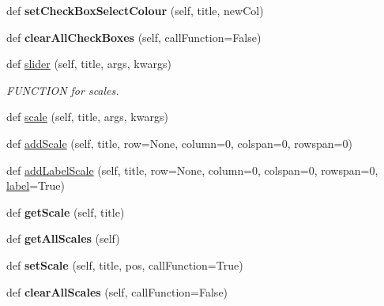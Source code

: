 \begin{DoxyCompactItemize}
def {\bfseries set\+Check\+Box\+Select\+Colour} (self, title, new\+Col)
\item 
\mbox{\label{class_python_01_g_u_i_1_1appjar_1_1gui_aaacc8db583838a4797aa585756f351b2}} 
def {\bfseries clear\+All\+Check\+Boxes} (self, call\+Function=False)
\item 
def \hyperlink{class_python_01_g_u_i_1_1appjar_1_1gui_af601e0be18cecae7abee6e159e45338a}{slider} (self, title, args, kwargs)
\begin{DoxyCompactList}\small\item\em F\+U\+N\+C\+T\+I\+ON for scales. \end{DoxyCompactList}\item 
def \hyperlink{class_python_01_g_u_i_1_1appjar_1_1gui_af487197cf6060c841c8fcfebeb77e314}{scale} (self, title, args, kwargs)
\item 
def \hyperlink{class_python_01_g_u_i_1_1appjar_1_1gui_a67f755e4d8eaa248bb8741f82b56c7e7}{add\+Scale} (self, title, row=None, column=0, colspan=0, rowspan=0)
\item 
def \hyperlink{class_python_01_g_u_i_1_1appjar_1_1gui_a7c00d0c50fa34004e61500001abc4e76}{add\+Label\+Scale} (self, title, row=None, column=0, colspan=0, rowspan=0, \hyperlink{class_python_01_g_u_i_1_1appjar_1_1gui_a899e593dca96dd2a31035558b685e3bd}{label}=True)
\item 
\mbox{\label{class_python_01_g_u_i_1_1appjar_1_1gui_a61db75894a43e88c3db1ff878bbef2ff}} 
def {\bfseries get\+Scale} (self, title)
\item 
\mbox{\label{class_python_01_g_u_i_1_1appjar_1_1gui_a6667f9d7607c185895352d40a0151b60}} 
def {\bfseries get\+All\+Scales} (self)
\item 
\mbox{\label{class_python_01_g_u_i_1_1appjar_1_1gui_a272750d930eed681c22b03cd526e0c24}} 
def {\bfseries set\+Scale} (self, title, pos, call\+Function=True)
\item 
\mbox{\label{class_python_01_g_u_i_1_1appjar_1_1gui_a7470ded3cad45c8ba4647053d3c43c26}} 
def {\bfseries clear\+All\+Scales} (self, call\+Function=False)
\item 
\mbox{\label{class_python_01_g_u_i_1_1appjar_1_1gui_af80483ed7ffe869605d995a1747f66df}} 

\end{DoxyCompactItemize}
